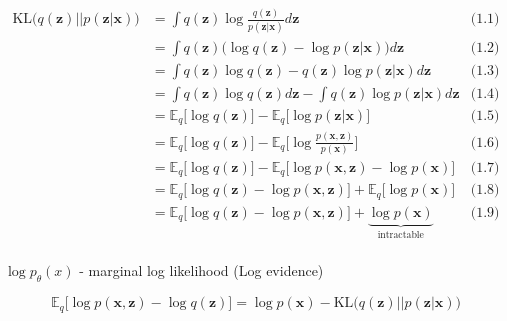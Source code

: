 \begin{equation}
    \begin{aligned}
        \text{KL} \big( q(\mathbf{z}) || p(\mathbf{z} | \mathbf{x}) \big)
         & = \int q(\mathbf{z}) \log \frac{q(\mathbf{z})}{p(\mathbf{z} | \mathbf{x})} d\mathbf{z}                                                  & \text{(1.1)} \\
         & = \int q(\mathbf{z}) \big( \log q(\mathbf{z}) - \log p(\mathbf{z} | \mathbf{x}) \big) d\mathbf{z}                                       & \text{(1.2)} \\
         & = \int q(\mathbf{z}) \log q(\mathbf{z}) - q(\mathbf{z}) \log p(\mathbf{z} | \mathbf{x}) d\mathbf{z}                                     & \text{(1.3)} \\
         & = \int q(\mathbf{z}) \log q(\mathbf{z}) d\mathbf{z} - \int q(\mathbf{z}) \log p(\mathbf{z} | \mathbf{x}) d\mathbf{z}                    & \text{(1.4)} \\
         & = \mathbb{E}_{q} \big[ \log q(\mathbf{z}) \big] - \mathbb{E}_{q} \big[ \log p(\mathbf{z} | \mathbf{x}) \big]                            & \text{(1.5)} \\
         & = \mathbb{E}_{q} \big[ \log q(\mathbf{z}) \big] - \mathbb{E}_{q} \bigg[ \log \frac{p(\mathbf{x}, \mathbf{z}) }{p(\mathbf{x})} \bigg]    & \text{(1.6)} \\
         & = \mathbb{E}_{q} \big[ \log q(\mathbf{z}) \big] - \mathbb{E}_{q} \big[ \log p(\mathbf{x}, \mathbf{z}) - \log p(\mathbf{x}) \big]        & \text{(1.7)} \\
         & = \mathbb{E}_{q} \big[ \log q(\mathbf{z}) - \log p(\mathbf{x}, \mathbf{z}) \big] + \mathbb{E}_{q} \big[ \log p(\mathbf{x}) \big]        & \text{(1.8)} \\
         & = \mathbb{E}_{q} \big[ \log q(\mathbf{z}) - \log p(\mathbf{x}, \mathbf{z}) \big] + \underbrace{\log p(\mathbf{x})}_{\text{intractable}} & \text{(1.9)} \\
    \end{aligned}
\end{equation}

$\log{p_\theta(x)}$ - marginal log likelihood (Log evidence)

\begin{equation}
    \mathbb{E}_{q} \big[\log p(\mathbf{x}, \mathbf{z}) - \log q(\mathbf{z}) \big] = \log p(\mathbf{x}) - \text{KL} \big( q(\mathbf{z}) || p(\mathbf{z} | \mathbf{x}) \big)
\end{equation}


